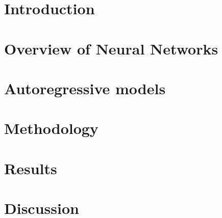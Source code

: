 \documentclass{thesis}
\begin{document}
\maketitle





\thesisTables
\thesisBodyStart

\chapter{Introduction}


\chapter{Overview of Neural Networks}


\chapter{Autoregressive models}


\chapter{Methodology}


\chapter{Results}


\chapter{Discussion}


\printReferences
\thesisTOT
\thesisTOF
\end{document}
